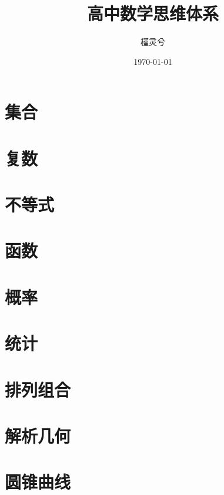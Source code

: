 \documentclass[12pt,UTF-8]{MathCyclus_book}
\title{高中数学思维体系}
\author{槿灵兮}
\date{\today}
\begin{document}
\thispagestyle{nohf}




\thispagestyle{nohf}
\clearpage
\tableofcontents
\thispagestyle{nohf}
\newpage

\setcounter{page}{1}


\chapter{集合}


\chapter{复数}


\chapter{不等式}


\chapter{函数}


\chapter{概率}


\chapter{统计}


\chapter{排列组合}


\chapter{解析几何}


\chapter{圆锥曲线}

\end{document}
